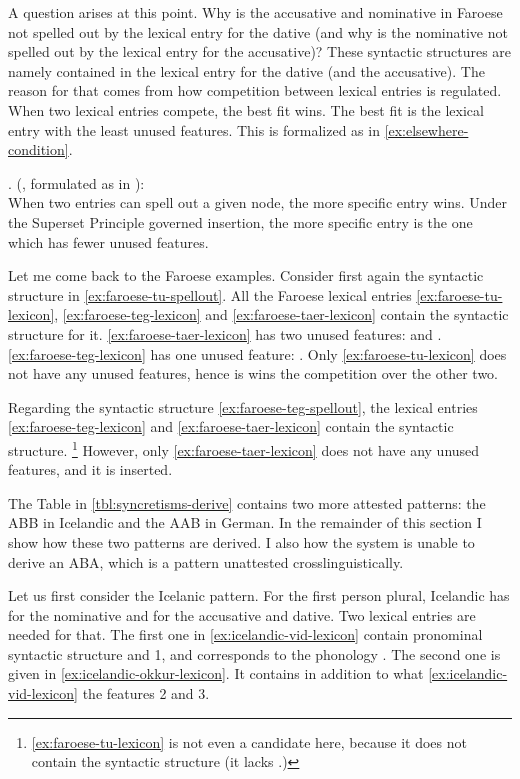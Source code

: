 A question arises at this point. Why is the accusative and nominative in Faroese not spelled out by the lexical entry for the dative (and why is the nominative not spelled out by the lexical entry for the accusative)? These syntactic structures are namely contained in the lexical entry for the dative (and the accusative).
The reason for that comes from how competition between lexical entries is regulated. When two lexical entries compete, the best fit wins. The best fit is the lexical entry with the least unused features. This is formalized as in \ref{ex:elsewhere-condition}.

\ex.  (\citealt{kiparsky1973}, formulated as in \citealt{caha2020}):\\
When two entries can spell out a given node, the more specific entry wins. Under the Superset Principle governed insertion, the more specific entry is the one which has fewer unused features.
\label{ex:elsewhere-condition}

Let me come back to the Faroese examples. Consider first again the syntactic structure in \ref{ex:faroese-tu-spellout}.
All the Faroese lexical entries \ref{ex:faroese-tu-lexicon}, \ref{ex:faroese-teg-lexicon} and \ref{ex:faroese-taer-lexicon} contain the syntactic structure for it.
\ref{ex:faroese-taer-lexicon} has two unused features:  and . \ref{ex:faroese-teg-lexicon} has one unused feature: . Only \ref{ex:faroese-tu-lexicon} does not have any unused features, hence is wins the competition over the other two.

Regarding the syntactic structure \ref{ex:faroese-teg-spellout}, the lexical entries \ref{ex:faroese-teg-lexicon} and \ref{ex:faroese-taer-lexicon} contain the syntactic structure. \footnote{
\ref{ex:faroese-tu-lexicon} is not even a candidate here, because it does not contain the syntactic structure (it lacks .)
}
However, only \ref{ex:faroese-taer-lexicon} does not have any unused features, and it is inserted.

The Table in \ref{tbl:syncretisms-derive} contains two more attested patterns: the ABB in Icelandic and the AAB in German. In the remainder of this section I show how these two patterns are derived. I also how the system is unable to derive an ABA, which is a pattern unattested crosslinguistically.

Let us first consider the Icelanic pattern. For the first person plural, Icelandic has  for the nominative and  for the accusative and dative. Two lexical entries are needed for that. The first one in \ref{ex:icelandic-vid-lexicon} contain pronominal syntactic structure and 1, and corresponds to the phonology .
The second one is given in \ref{ex:icelandic-okkur-lexicon}. It contains in addition to what \ref{ex:icelandic-vid-lexicon} the features 2 and 3.

